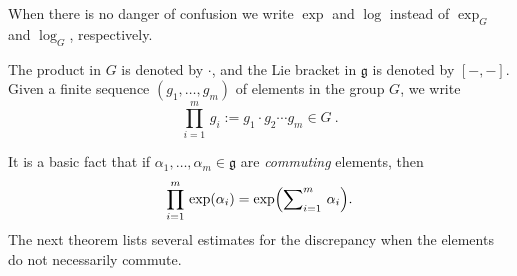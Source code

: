 \documentclass[10pt, a4paper]{amsart}
\theoremstyle{definition}
\numberwithin{equation}{section}
\newcommand{\opn}{\operatorname}
\newcommand{\mfrak}[1]{\mathfrak{#1}}
\newcommand{\bosum}{\sum\nolimits}
\newcommand{\g}{\mfrak{g}}
\begin{document}
When there is no danger of confusion we write $\exp$ and $\log$ instead of 
$\opn{exp}_G$ and $\log_G$, respectively.

The product in $G$ is denoted by $\cdot$, and the Lie bracket in $\g$ is
denoted by $[-,-]$. Given a finite sequence
$(g_1, \ldots, g_m)$ of elements in the group $G$, we write
\begin{equation} \label{eqn:6}
\prod_{i = 1}^m \, g_i := g_1 \cdot g_2 \cdots g_m \in G \ .
\end{equation}

It is a basic fact that if 
 $\alpha_1, \ldots, \alpha_m \in \g$
are {\em commuting} elements, then 
\[ \prod_{i=1}^m\, \opn{exp}(\alpha_i) = 
\exp \Bigl( \bosum_{i=1}^m \, \alpha_i \Bigr) . \]
The next theorem lists several estimates for the discrepancy when the elements
do not necessarily commute. 
\end{document}
